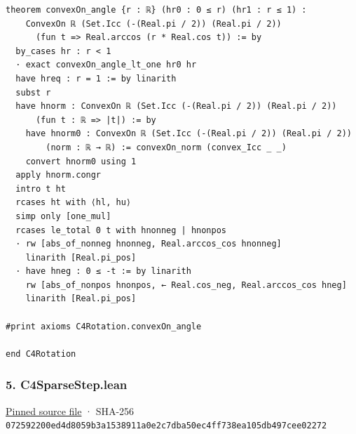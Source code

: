 \documentclass[11pt,a4paper]{article}
\begin{document}
\begin{Verbatim}[breaklines,breakanywhere,fontsize=\footnotesize]
theorem convexOn_angle {r : ℝ} (hr0 : 0 ≤ r) (hr1 : r ≤ 1) :
    ConvexOn ℝ (Set.Icc (-(Real.pi / 2)) (Real.pi / 2))
      (fun t => Real.arccos (r * Real.cos t)) := by
  by_cases hr : r < 1
  · exact convexOn_angle_lt_one hr0 hr
  have hreq : r = 1 := by linarith
  subst r
  have hnorm : ConvexOn ℝ (Set.Icc (-(Real.pi / 2)) (Real.pi / 2))
      (fun t : ℝ => |t|) := by
    have hnorm0 : ConvexOn ℝ (Set.Icc (-(Real.pi / 2)) (Real.pi / 2))
        (norm : ℝ → ℝ) := convexOn_norm (convex_Icc _ _)
    convert hnorm0 using 1
  apply hnorm.congr
  intro t ht
  rcases ht with ⟨hl, hu⟩
  simp only [one_mul]
  rcases le_total 0 t with hnonneg | hnonpos
  · rw [abs_of_nonneg hnonneg, Real.arccos_cos hnonneg]
    linarith [Real.pi_pos]
  · have hneg : 0 ≤ -t := by linarith
    rw [abs_of_nonpos hnonpos, ← Real.cos_neg, Real.arccos_cos hneg]
    linarith [Real.pi_pos]

#print axioms C4Rotation.convexOn_angle

end C4Rotation
\end{Verbatim}

\subsubsection{5. C4SparseStep.lean}\label{c4sparsestep.lean}

\href{https://github.com/mpelteshki/climbing-to-the-frontier/blob/29fbb70da18564048f62492e43870f2f96a65463/cagent/p1/C4SparseStep.lean}{Pinned source file} · SHA-256 \texttt{07259220\allowbreak{}0ed4d805\allowbreak{}9b3a1538\allowbreak{}911a0e2c\allowbreak{}7dba50ec\allowbreak{}4ff738ea\allowbreak{}105db497\allowbreak{}cee02272}
\end{document}
